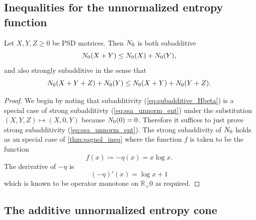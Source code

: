 \documentclass[notitlepage, 10pt]{article}
\begin{document}
\subsection{Inequalities for the unnormalized entropy function}
\label{sec:unent_ineq}
\begin{thm}
    \label{thm:unnormalized_entropy_ssa}
    Let $X, Y, Z \geq 0$ be PSD matrices.
    Then $N_{0}$ is both subadditive
    \begin{equation}
        \label{eq:subadditive_Hbeta}
        N_{0}(X+Y) \leq N_{0}(X) + N_{0}(Y),
    \end{equation}
    and also strongly subadditive in the sense that
    \begin{equation}
        \label{eq:ssa_unnorm_ent}
        N_{0}(X+Y+Z) + N_{0}(Y) \leq N_{0}(X+Y) + N_{0}(Y+Z).
    \end{equation}
\end{thm}
\begin{proof}
    We begin by noting that subadditivity (\cref{eq:subadditive_Hbeta}) is a special case of strong subadditivty (\cref{eq:ssa_unnorm_ent}) under the substitution $(X,Y,Z) \mapsto (X, 0, Y)$ because $N_{0}(0) = 0$.
    Therefore it suffices to just prove strong subadditivity (\cref{eq:ssa_unnorm_ent}).
    The strong subaddivity of $N_{0}$ holds as an special case of \cref{thm:sagnol_ineq} where the function $f$ is taken to be the function 
    \begin{equation}
        f(x) \coloneqq -\eta(x) = x \log x.
    \end{equation}
    The derivative of $-\eta$ is
    \begin{equation}
        (-\eta)'(x) = \log x + 1
    \end{equation}
    which is known to be operator monotone \cite{chansangiam2013operator} on $\mathbb R_>0$ as required.
\end{proof}

\subsection{The additive unnormalized entropy cone}
\label{sec:unent_cone}
\end{document}
